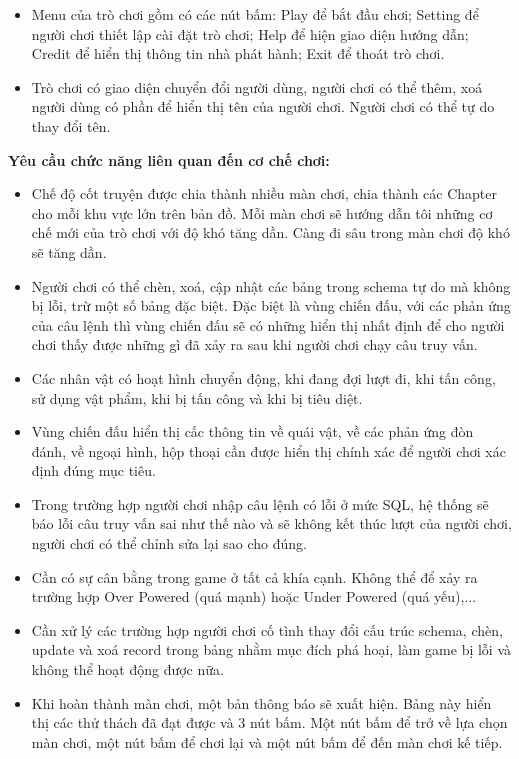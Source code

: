 \begin{itemize}
	\item Menu của trò chơi gồm có các nút bấm: Play để bắt đầu chơi; Setting để người chơi thiết lập cài đặt trò chơi; Help để hiện giao diện hướng dẫn; Credit để hiển thị thông tin nhà phát hành; Exit để thoát trò chơi.
	\item Trò chơi có giao diện chuyển đổi người dùng, người chơi có thể thêm, xoá người dùng có phần để hiển thị tên của người chơi. Người chơi có thể tự do thay đổi tên.
\end{itemize}

\textbf{Yêu cầu chức năng liên quan đến cơ chế chơi:}
\begin{itemize}
	\item Chế độ cốt truyện được chia thành nhiều màn chơi, chia thành các Chapter cho mỗi khu vực lớn trên bản đồ. Mỗi màn chơi sẽ hướng dẫn tôi những cơ chế mới của trò chơi với độ khó tăng dần. Càng đi sâu trong màn chơi độ khó sẽ tăng dần. 
	\item Người chơi có thể chèn, xoá, cập nhật các bảng trong schema tự do mà không bị lỗi, trừ một số bảng đặc biệt. Đặc biệt là vùng chiến đấu, với các phản ứng của câu lệnh thì vùng chiến đấu sẽ có những hiển thị nhất định để cho người chơi thấy được những gì đã xảy ra sau khi người chơi chạy câu truy vấn.
	\item Các nhân vật có hoạt hình chuyển động, khi đang đợi lượt đi, khi tấn công, sử dụng vật phẩm, khi bị tấn công và khi bị tiêu diệt.
	\item Vùng chiến đấu hiển thị cấc thông tin về quái vật, về các phản ứng đòn đánh, về ngoại hình, hộp thoại cần được hiển thị chính xác để người chơi xác định đúng mục tiêu.
	\item Trong trường hợp người chơi nhập câu lệnh có lỗi ở mức SQL, hệ thống sẽ báo lỗi câu truy vấn sai như thế nào và sẽ không kết thúc lượt của người chơi, người chơi có thể chỉnh sửa lại sao cho đúng. 
	\item Cần có sự cân bằng trong game ở tất cả khía cạnh. Không thể để xảy ra trường hợp Over Powered (quá mạnh) hoặc Under Powered (quá yếu),...
	\item Cần xử lý các trường hợp người chơi cố tình thay đổi cấu trúc schema, chèn, update và xoá record trong bảng nhằm mục đích phá hoại, làm game bị lỗi và không thể hoạt động được nữa.
	\item Khi hoàn thành màn chơi, một bản thông báo sẽ xuất hiện. Bảng này hiển thị các thử thách đã đạt được và 3 nút bấm. Một nút bấm để trở về lựa chọn màn chơi, một nút bấm để chơi lại và một nút bấm để đến màn chơi kế tiếp.
	
\end{itemize}


